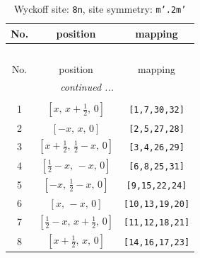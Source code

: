 \documentclass[fleqn,8pt]{jsarticle}
\begin{document}
\begin{longtable}{ccc}
\caption{Wyckoff site: {\tt 8n}, site symmetry: {\tt m'.2m'}}
 \\
 \hline \hline
No. & position & mapping \\ \hline \endfirsthead

\multicolumn{2}{l}{\tablename\ \thetable{}} \\
 \hline \hline
No. & position & mapping \\ \hline \endhead

 \hline \hline
\multicolumn{2}{r}{\footnotesize\it continued ...} \\ \endfoot

 \hline \hline
\multicolumn{2}{r}{} \\ \endlastfoot

1 & $\left[ x,\, x + \frac{1}{2},\, 0 \right]$ & {\tt [1,7,30,32]} \\ \hline
2 & $\left[ - x,\, x,\, 0 \right]$ & {\tt [2,5,27,28]} \\ \hline
3 & $\left[ x + \frac{1}{2},\, \frac{1}{2} - x,\, 0 \right]$ & {\tt [3,4,26,29]} \\ \hline
4 & $\left[ \frac{1}{2} - x,\, - x,\, 0 \right]$ & {\tt [6,8,25,31]} \\ \hline
5 & $\left[ - x,\, \frac{1}{2} - x,\, 0 \right]$ & {\tt [9,15,22,24]} \\ \hline
6 & $\left[ x,\, - x,\, 0 \right]$ & {\tt [10,13,19,20]} \\ \hline
7 & $\left[ \frac{1}{2} - x,\, x + \frac{1}{2},\, 0 \right]$ & {\tt [11,12,18,21]} \\ \hline
8 & $\left[ x + \frac{1}{2},\, x,\, 0 \right]$ & {\tt [14,16,17,23]} \\
\end{longtable}
\renewcommand{\arraystretch}{1.2}
\end{document}
